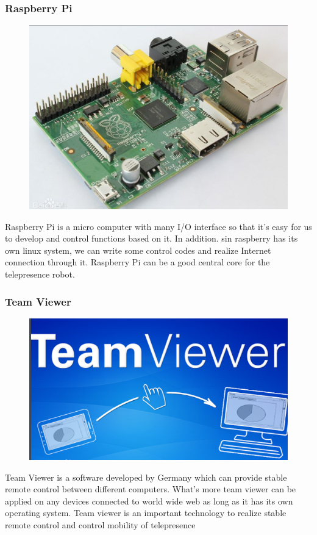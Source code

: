 \documentclass[12pt]{article}
\begin{document}
\subsubsection{Raspberry Pi}
\begin{figure}[H]
\centering
\includegraphics[scale=0.15]{P3.png}
\end{figure}
Raspberry Pi is a micro computer with many I/O interface so that it's easy for us to develop and control functions based on it. In addition. sin raspberry has its own linux system, we can write some control codes and realize Internet connection through it. Raspberry Pi can be a good central core for the telepresence robot.
\subsubsection{Team Viewer}
\begin{figure}[H]
\centering
\includegraphics[scale=0.3]{P4.png}
\end{figure}
Team Viewer is a software developed by Germany which can provide stable remote control between different computers. What's more team viewer can be applied on any devices connected to world wide web as long as it has its own operating system. Team viewer is an important technology to realize stable remote control and control mobility of telepresence
\end{document}

